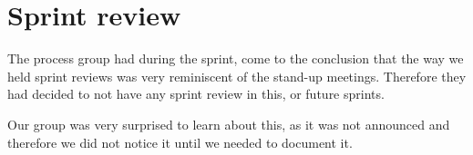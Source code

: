 \section{Sprint review}
The process group had during the sprint, come to the conclusion that the way we held sprint reviews was very reminiscent of the stand-up meetings.
Therefore they had decided to not have any sprint review in this, or future sprints. 

Our group was very surprised to learn about this, as it was not announced and therefore we did not notice it until we needed to document it.
